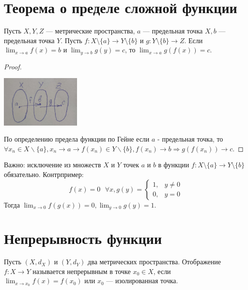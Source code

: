     \section{Теорема о пределе сложной функции}
    
    \begin{theorem}
    	Пусть $X, Y, Z$ — метрические пространства, $a$ — предельная точка $X, b$ — предельная точка $Y$. Пусть $f : X \setminus \{a\} \rightarrow Y \setminus \{b\}$ и $g : Y \setminus \{b\} \rightarrow Z$. Если $\displaystyle \lim_{x \to a} f(x) = b$ и $\displaystyle \lim_{y \to b} g(y) = c$, то $\displaystyle \lim_{x \to a} g(f(x)) = c$.
    \end{theorem}
    
    \begin{proof}
    	$ $
    	\begin{center}
    		\includegraphics[width=0.3\textwidth]{img/lecture35/limit_of_a_complex_function}
    	\end{center}
    	По определению предела функции по Гейне если $a$ - предельная точка, то $\forall x_n \in X \backslash \{a\}, x_n \to a \rightarrow f(x_n) \in Y \backslash \{b\}, f(x_n) \to b \Rightarrow g(f(x_n)) \to c$.
    \end{proof}
    
    Важно: исключение из множеств $X$ и $Y$ точек $a$ и $b$ в функции $f: X \setminus \{a\} \rightarrow Y \setminus \{b\}$ обязательно. Контрпример:
    \begin{equation*}
    	f(x) = 0 \text{ } \forall x, g(y) = 
    	\begin{cases}
    		1, & y \neq 0 \\
    		0, & y = 0
    	\end{cases}
    \end{equation*}
    Тогда $\lim_{x \to 0} f(g(x)) = 0, \lim_{y \to 0} g(y) = 1$.
    
    \section{Непрерывность функции}
    
    \begin{definition}
    	Пусть $(X, d_X)$ и $(Y, d_Y)$ два метрических пространства. Отображение $f : X \rightarrow Y$ называется непрерывным в точке $x_0 \in X$, если $\displaystyle \lim_{x \to x_0} f(x) = f(x_0)$ или $x_0$ — изолированная точка.
    \end{definition}
    
